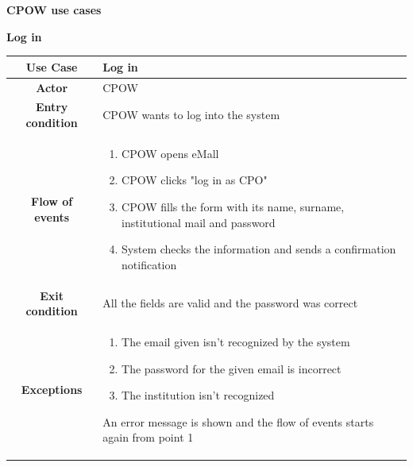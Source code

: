 \documentclass[table, 12pt]{article} %
\begin{document}
\begin{itemize}
\begin{table}[H]
\begin{tabular}{|c |m{}|}
                \end{tabular}
            \end{table}
            \pagebreak
            \item \textbf {CPOW use cases}
            \begin{table}[H]
                \item[] \textbf{Log in}
                \item[]
                \centering
                \begin{tabular}{|c |m{}|}
                    \hline
                    \textbf{Use Case} & Log in\\ \hline
                    \textbf{Actor} & CPOW\\ \hline
                    \textbf{Entry condition} & CPOW wants to log into the system \\  \hline
                    \textbf{Flow of events} & \begin{enumerate}
                                                \item CPOW opens eMall
                                                \item CPOW clicks "log in as CPO"
                                                \item CPOW fills the form with its name, surname, institutional mail and password
                                                \item System checks the information and sends a confirmation notification
                                            \end{enumerate}\\ \hline
                    \textbf{Exit condition} &  All the fields are valid and the password was correct\\ \hline
                    \textbf{Exceptions} &  \begin{enumerate}
                        \item The email given isn't recognized by the system
                        \item The password for the given email is incorrect
                        \item The institution isn't recognized
                    \end{enumerate}
                    An error message is shown and the flow of events starts again from point 1\\ \hline
                \end{tabular}
            \end{table}


\end{itemize}
\end{document}
